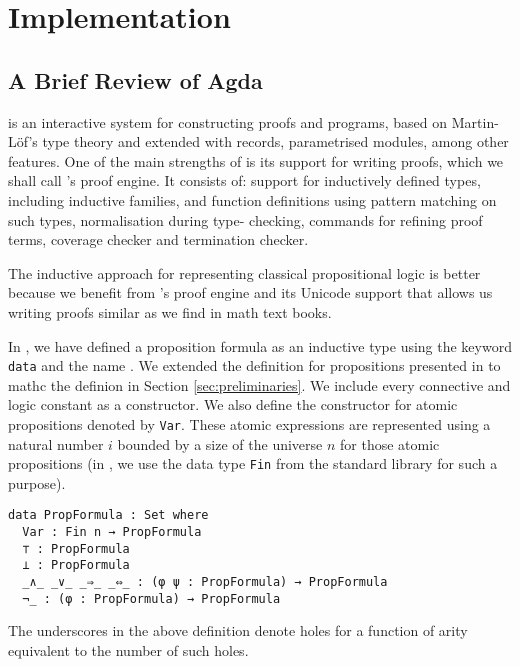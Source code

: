 \documentclass[../main.tex]{subfiles}
\begin{document}

\section{Implementation}
\label{sec:implementation}


\subsection{A Brief Review of Agda}
\label{ssec:agda-definition}

\Agda is an interactive system for constructing proofs and programs,
based on Martin-L\"{o}f's type theory and extended with records,
parametrised modules, among other features. One of the main
strengths of \Agda is its support for writing proofs, which we shall
call \Agda's proof engine. It consists of: support for inductively
defined types, including inductive families, and function
definitions using pattern matching on such types, normalisation
during type- checking, commands for refining proof terms, coverage
checker and termination checker.

The inductive approach for representing classical propositional
logic is better because we benefit from \Agda's proof engine and its
Unicode support that allows us writing proofs similar as we find in
math text books.

In \Agda, we have defined a proposition formula
as an inductive type using the keyword \texttt{data} and the name
.
We extended the definition for propositions presented in
\cite{Altenkirch2015} to mathc the definion in Section
\ref{sec:preliminaries}.
We include every connective and logic constant as a constructor.
We also define the constructor for atomic propositions denoted by
\verb!Var!. These atomic expressions are represented using a natural
number $i$ bounded by a size of the universe $n$ for those atomic
propositions (in \Agda, we use the data type \verb!Fin! from the
standard  library for such a purpose).

\begin{verbatim}
data PropFormula : Set where
  Var : Fin n → PropFormula
  ⊤ : PropFormula
  ⊥ : PropFormula
  _∧_ _∨_ _⇒_ _⇔_ : (φ ψ : PropFormula) → PropFormula
  ¬_ : (φ : PropFormula) → PropFormula
\end{verbatim}

\begin{remark}
The underscores in the above definition denote holes for a function of arity equivalent to the number of such holes.
\end{remark}
\end{document}
